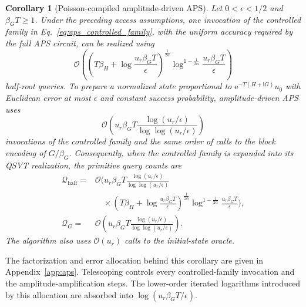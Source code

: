 \documentclass[aps,pra,reprint,floatfix,unsortedaddress,superscriptaddress]{revtex4-2}
\newtheorem{corollary}[theorem]{Corollary}
\newcommand{\Ocal}{\mathcal{O}}
\begin{document}
\begin{corollary}[Poisson-compiled amplitude-driven APS]
\label{cor:aps_complexity}
Let $0<\epsilon<1/2$ and $\beta_G T\geq1$.  Under the preceding access
assumptions, one invocation of the controlled family in
Eq.~\eqref{eq:aps_controlled_family}, with the uniform accuracy required
by the full APS circuit, can be realized using
\begin{equation}
\Ocal\!\left(
 \left(
 T\beta_H+\log\frac{u_r\beta_G T}{\epsilon}
 \right)^{\frac{1}{2\alpha}}
 \log^{1-\frac{1}{2\alpha}}\!\frac{u_r\beta_G T}{\epsilon}
\right)
\label{eq:aps_family_degree}
\end{equation}
half-root queries.  To prepare a normalized state proportional to
$\mathrm e^{-T(H+\mathrm iG)}u_0$ with Euclidean error at most
$\epsilon$ and constant success probability, amplitude-driven APS uses
\begin{equation}
\Ocal\!\left(
u_r\beta_G T
\frac{\log(u_r/\epsilon)}{\log\log(u_r/\epsilon)}
\right)
\label{eq:aps_family_calls}
\end{equation}
invocations of the controlled family and the same order of calls to
the block encoding of $G/\beta_G$.  Consequently, when the controlled
family is expanded into its QSVT realization, the primitive query
counts are
\begin{align}
\mathcal Q_{\mathrm{half}}
={}&\Ocal\!\Bigg(
u_r\beta_G T
\frac{\log(u_r/\epsilon)}{\log\log(u_r/\epsilon)}
\nonumber\\[-1mm]
&\quad\times
\left(
T\beta_H+\log\frac{u_r\beta_G T}{\epsilon}
\right)^{\frac{1}{2\alpha}}
\log^{1-\frac{1}{2\alpha}}\!\frac{u_r\beta_G T}{\epsilon}
\Bigg),
\label{eq:aps_flat_half_root_queries}\\
\mathcal Q_G
={}&\Ocal\!\left(
u_r\beta_G T
\frac{\log(u_r/\epsilon)}{\log\log(u_r/\epsilon)}
\right).
\label{eq:aps_flat_g_queries}
\end{align}
The algorithm also uses $\Ocal(u_r)$ calls to the initial-state oracle.
\end{corollary}

The factorization and error allocation behind this corollary are given
in Appendix~\ref{app:aps}.  Telescoping controls every controlled-family
invocation and the amplitude-amplification steps.  The lower-order
iterated logarithms introduced by this allocation are absorbed into
$\log(u_r\beta_G T/\epsilon)$.
\end{document}
